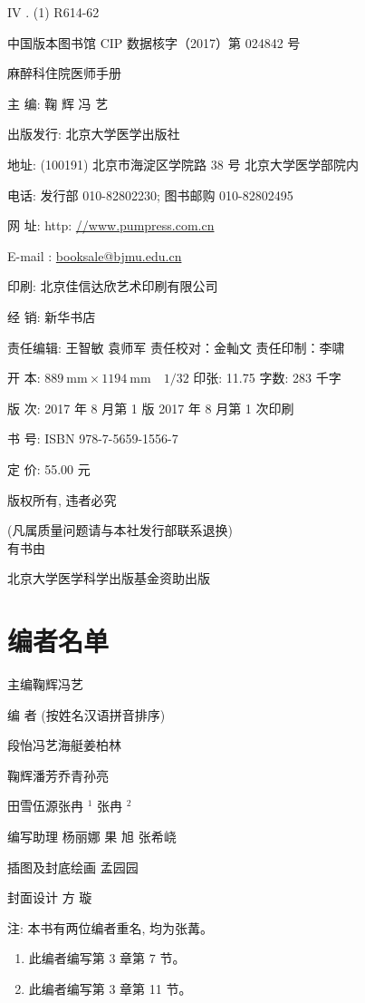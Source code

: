 \documentclass[10pt]{article}
\begin{document}
IV . (1) R614-62

中国版本图书馆 CIP 数据核字（2017）第 024842 号

麻醉科住院医师手册

主 编: 鞠 辉 冯 艺

出版发行: 北京大学医学出版社

地址: (100191) 北京市海淀区学院路 38 号 北京大学医学部院内

电话: 发行部 010-82802230; 图书邮购 010-82802495

网 址: http: \href{//www.pumpress.com.cn}{//www.pumpress.com.cn}

E-mail : \href{mailto:booksale@bjmu.edu.cn}{booksale@bjmu.edu.cn}

印刷: 北京佳信达欣艺术印刷有限公司

经 销: 新华书店

责任编辑: 王智敏 袁师军 责任校对：金軕文 责任印制：李啸

开 本: $889 \mathrm{~mm} \times 1194 \mathrm{~mm} \quad 1 / 32$ 印张: 11.75 字数: 283 千字

版 次: 2017 年 8 月第 1 版 2017 年 8 月第 1 次印刷

书 号: ISBN 978-7-5659-1556-7

定 价: 55.00 元

版权所有, 违者必究

(凡属质量问题请与本社发行部联系退换)\\
有书由

北京大学医学科学出版基金资助出版

\section*{编者名单}
主编鞠辉冯艺

编 者 (按姓名汉语拼音排序)

段怡冯艺海艇姜柏林

鞠辉潘芳乔青孙亮

田雪伍源张冉 ${ }^{1}$ 张冉 $^{2}$

编写助理 杨丽娜 果 旭 张希峣

插图及封底绘画 孟园园

封面设计 方 璇

注: 本书有两位编者重名, 均为张冓。

\begin{enumerate}
  \item 此编者编写第 3 章第 7 节。

  \item 此编者编写第 3 章第 11 节。

\end{enumerate}
\end{document}
